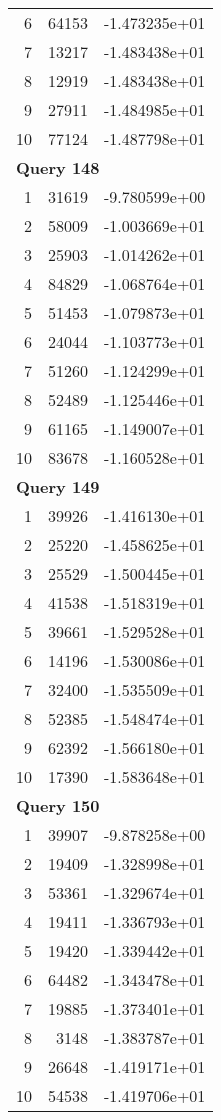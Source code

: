 \begin{longtable}[{p}]{@{}rrp{}@{}}
6 & 64153 & -1.473235e+01 \\
7 & 13217 & -1.483438e+01 \\
8 & 12919 & -1.483438e+01 \\
9 & 27911 & -1.484985e+01 \\
10 & 77124 & -1.487798e+01 \\
\midrule
\multicolumn{3}{l}{\bfseries Query 148} \\
1 & 31619 & -9.780599e+00 \\
2 & 58009 & -1.003669e+01 \\
3 & 25903 & -1.014262e+01 \\
4 & 84829 & -1.068764e+01 \\
5 & 51453 & -1.079873e+01 \\
6 & 24044 & -1.103773e+01 \\
7 & 51260 & -1.124299e+01 \\
8 & 52489 & -1.125446e+01 \\
9 & 61165 & -1.149007e+01 \\
10 & 83678 & -1.160528e+01 \\
\midrule
\multicolumn{3}{l}{\bfseries Query 149} \\
1 & 39926 & -1.416130e+01 \\
2 & 25220 & -1.458625e+01 \\
3 & 25529 & -1.500445e+01 \\
4 & 41538 & -1.518319e+01 \\
5 & 39661 & -1.529528e+01 \\
6 & 14196 & -1.530086e+01 \\
7 & 32400 & -1.535509e+01 \\
8 & 52385 & -1.548474e+01 \\
9 & 62392 & -1.566180e+01 \\
10 & 17390 & -1.583648e+01 \\
\midrule
\multicolumn{3}{l}{\bfseries Query 150} \\
1 & 39907 & -9.878258e+00 \\
2 & 19409 & -1.328998e+01 \\
3 & 53361 & -1.329674e+01 \\
4 & 19411 & -1.336793e+01 \\
5 & 19420 & -1.339442e+01 \\
6 & 64482 & -1.343478e+01 \\
7 & 19885 & -1.373401e+01 \\
8 & 3148 & -1.383787e+01 \\
9 & 26648 & -1.419171e+01 \\
10 & 54538 & -1.419706e+01 \\
\end{longtable}
